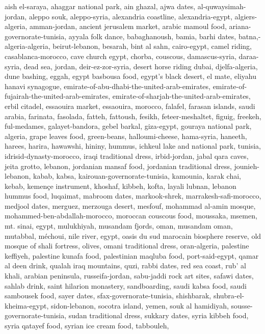 \documentclass{article}
\begin{document}
aish el-saraya,
ahaggar national park,
ain ghazal,
ajwa dates,
al-quwaysimah-jordan,
aleppo souk,
aleppo-syria,
alexandria coastline,
alexandria-egypt,
algiers-algeria,
amman-jordan,
ancient jerusalem market,
arabic mamoul food,
ariana-governorate-tunisia,
ayyala folk dance,
babaghanoush,
bamia,
barhi dates,
batna,-algeria-algeria,
beirut-lebanon,
besarah,
bint al sahn,
cairo-egypt,
camel riding,
casablanca-morocco,
cave church egypt,
chorba,
couscous,
damascus-syria,
daraa-syria,
dead sea, jordan,
deir-ez-zor-syria,
desert horse riding dubai,
djelfa-algeria,
dune bashing,
eggah,
egypt basbousa food,
egypt’s black desert,
el mate,
eliyahu hanavi synagogue,
emirate-of-abu-dhabi-the-united-arab-emirates,
emirate-of-fujairah-the-united-arab-emirates,
emirate-of-sharjah-the-united-arab-emirates,
erbil citadel,
essaouira market,
essaouira, morocco,
falafel,
farasan islands, saudi arabia,
farinata,
fasolada,
fatteh,
fattoush,
fesikh,
feteer-meshaltet,
figuig,
freekeh,
ful-medames,
galayet-bandora,
gebel barkal,
giza-egypt,
gouraya national park, algeria,
grape leaves food,
green-beans,
halloumi-cheese,
hama-syria,
haneeth,
harees,
harira,
hawawshi,
hininy,
hummus,
ichkeul lake and national park, tunisia,
idrisid-dynasty-morocco,
iraqi traditional dress,
irbid-jordan,
jabal qara caves,
jeita grotto, lebanon,
jordanian mansaf food,
jordanian traditional dress,
jounieh-lebanon,
kabab,
kabsa,
kairouan-governorate-tunisia,
kamounia,
karak chai,
kebab,
kemençe instrument,
khoshaf,
kibbeh,
kofta,
layali lubnan,
lebanon hummus food,
luqaimat,
mabroom dates,
markook-shrek,
marrakesh-safi-morocco,
medjool dates,
merguez,
merzouga desert,
mesfouf,
mohammad al-amin mosque,
mohammed-ben-abdallah-morocco,
moroccan couscous food,
moussaka,
msemen,
mt. sinai, egypt,
mulukhiyah,
musandam fjords, oman,
musandam oman,
mutabbal,
méchoui,
nile river, egypt,
oasis du sud marocain biosphere reserve,
old mosque of shali fortress,
olives,
omani traditional dress,
oran-algeria,
palestine keffiyeh,
palestine kunafa food,
palestinian maqluba food,
port-said-egypt,
qamar al deen drink,
qualah iraq mountains,
quzi,
rabbi dates,
red sea coast,
rub’ al khali, arabian peninsula,
russeifa-jordan,
sabu-jaddi rock art sites,
safawi dates,
sahlab drink,
saint hilarion monastery,
sandboarding,
saudi kabsa food,
saudi sambousek food,
sayer dates,
sfax-governorate-tunisia,
shishbarak,
shubra-el-kheima-egypt,
sidon-lebanon,
socotra island, yemen,
souk al hamidiyah,
sousse-governorate-tunisia,
sudan traditional dress,
sukkary dates,
syria kibbeh food,
syria qatayef food,
syrian ice cream food,
tabbouleh,
\end{document}
